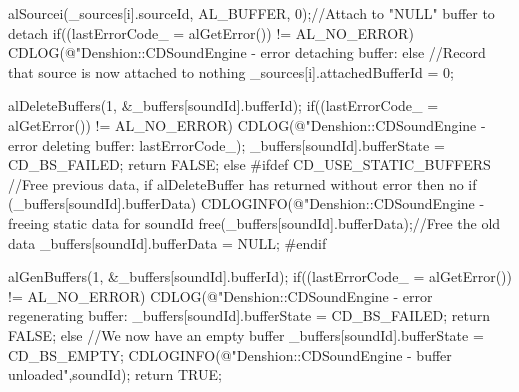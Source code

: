 \begin{DoxyCode}
{{{                        alSourcei(_sources[i].sourceId, AL_BUFFER, 0);//Attach
       to "NULL" buffer to detach
                        if((lastErrorCode_ = alGetError()) != AL_NO_ERROR) {
                                CDLOG(@"Denshion::CDSoundEngine - error
       detaching buffer: %
                        } else {
                                //Record that source is now attached to nothing
                                _sources[i].attachedBufferId = 0;
                        }
                }
        }

        alDeleteBuffers(1, &_buffers[soundId].bufferId);
        if((lastErrorCode_ = alGetError()) != AL_NO_ERROR) {
                CDLOG(@"Denshion::CDSoundEngine - error deleting buffer: %
       lastErrorCode_);
                _buffers[soundId].bufferState = CD_BS_FAILED;
                return FALSE;
        } else {
#ifdef CD_USE_STATIC_BUFFERS
                //Free previous data, if alDeleteBuffer has returned without
       error then no
                if (_buffers[soundId].bufferData) {
                        CDLOGINFO(@"Denshion::CDSoundEngine - freeing static
       data for soundId %
                        free(_buffers[soundId].bufferData);//Free the old data
                        _buffers[soundId].bufferData = NULL;
                }
#endif
        }

        alGenBuffers(1, &_buffers[soundId].bufferId);
        if((lastErrorCode_ = alGetError()) != AL_NO_ERROR) {
                CDLOG(@"Denshion::CDSoundEngine - error regenerating buffer:
                _buffers[soundId].bufferState = CD_BS_FAILED;
                return FALSE;
        } else {
                //We now have an empty buffer
                _buffers[soundId].bufferState = CD_BS_EMPTY;
                CDLOGINFO(@"Denshion::CDSoundEngine - buffer %
       unloaded\n",soundId);
                return TRUE;
        }
}
\end{DoxyCode}


